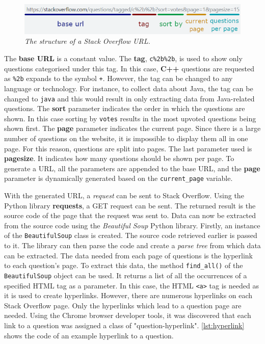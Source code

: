\documentclass[12pt,a4paper]{article}
\newcommand{\captionstyle}[1] {
    \small{\textit{#1}}
}
\begin{document}
\begin{figure}[!htb]%
    \centering
    \includegraphics[width=1.0\columnwidth]{so-url}%
    \caption{\captionstyle{The structure of a Stack Overflow URL.}}%
    \label{fig:so-url}%
\end{figure}

The \textbf{base URL} is a constant value. The \textbf{tag}, \texttt{c\%2b\%2b}, is used to show only questions categorised under this tag. In this case, \textbf{C++} questions are requested as \texttt{\%2b} expands to the symbol \texttt{+}. However, the tag can be changed to any language or technology. For instance, to collect data about Java, the tag can be changed to \texttt{java} and this would result in only extracting data from Java-related questions. The \textbf{sort} parameter indicates the order in which the questions are shown. In this case sorting by \texttt{votes} results in the most upvoted questions being shown first. The \textbf{page} parameter indicates the current page. Since there is a large number of questions on the website, it is impossible to display them all in one page. For this reason, questions are split into pages. The last parameter used is \textbf{pagesize}. It indicates how many questions should be shown per page. To generate a URL, all the parameters are appended to the base URL, and the \textbf{page} parameter is dynamically generated based on the \texttt{current\_page} variable. 

With the generated URL, a \textit{request} can be sent to Stack Overflow. Using the Python library \textbf{requests}, a GET request can be sent. The returned result is the source code of the page that the request was sent to. Data can now be extracted from the source code using the \textit{Beautiful Soup} Python library. Firstly, an instance of the \texttt{BeautifulSoup} class is created. The source code retrieved earlier is passed to it. The library can then parse the code and create a \textit{parse tree} from which data can be extracted. The data needed from each page of questions is the hyperlink to each question's page. To extract this data, the method \texttt{find\_all()} of the \texttt{BeautifulSoup} object can be used. It returns a list of all the occurrences of a specified HTML tag as a parameter. In this case, the HTML \texttt{<a>} tag is needed as it is used to create hyperlinks. However, there are numerous hyperlinks on each Stack Overflow page. Only the hyperlinks which lead to a question page are needed. Using the Chrome browser developer tools, it was discovered that each link to a question was assigned a class of "question-hyperlink". \cref{lst:hyperlink} shows the code of an example hyperlink to a question.
\end{document}
